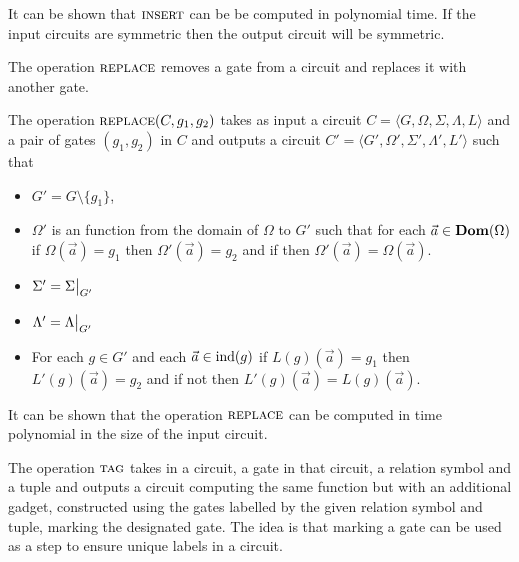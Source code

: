 \documentclass[../paper.tex]{subfiles}
\begin{document}
It can be shown that ${\normalfont\textsc{insert}}$ can be be computed in polynomial time. If the
input circuits are symmetric then the output circuit will be symmetric.

The operation ${\normalfont\textsc{replace}}$ removes a gate from a circuit and replaces it with
another gate.
  
\begin{definition}
  The operation ${\normalfont\textsc{replace}}(C, g_1, g_2)$ takes as input a circuit $C =
  \langle G, \Omega, \Sigma, \Lambda, L\rangle$ and a pair of gates $(g_1, g_2)$
  in $C$ and outputs a circuit $C' = \langle G', \Omega', \Sigma', \Lambda', L'
  \rangle$ such that
  \begin{itemize}
    \setlength\itemsep{0mm}
  \item $G' = G \setminus \{g_1\}$,
  \item $\Omega'$ is an function from the domain of $\Omega$ to $G'$ such that
    for each $\vec{a} \in \text{\textbf{Dom}}(\Omega)$ if $\Omega(\vec{a}) = g_1$ then
    $\Omega'(\vec{a}) = g_2$ and if then $\Omega'(\vec{a}) = \Omega(\vec{a})$.
  \item $\Sigma' = \restr{\Sigma}{G'}$
  \item $\Lambda' = \restr{\Lambda}{G'}$
  \item For each $g \in G'$ and each $\vec{a} \in \text{\upshape ind}(g)$ if $L(g)(\vec{a}) =
    g_1$ then $L'(g)(\vec{a}) = g_2$ and if not then $L'(g)(\vec{a}) =
    L(g)(\vec{a})$.
  \end{itemize}
\end{definition}

It can be shown that the operation ${\normalfont\textsc{replace}}$ can be computed in time
polynomial in the size of the input circuit.

The operation ${\normalfont\textsc{tag}}$ takes in a circuit, a gate in that circuit, a relation
symbol and a tuple and outputs a circuit computing the same function but with an
additional gadget, constructed using the gates labelled by the given relation
symbol and tuple, marking the designated gate. The idea is that marking a gate
can be used as a step to ensure unique labels in a circuit.
\end{document}
